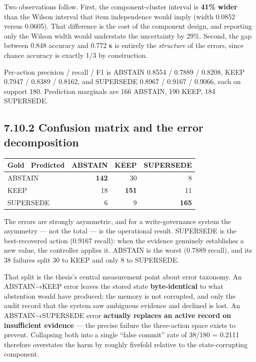 Two observations follow. First, the component-cluster interval is
\textbf{41\% wider} than the Wilson interval that item independence
would imply (width 0.0852 versus 0.0605). That difference is the cost of
the component design, and reporting only the Wilson width would
understate the uncertainty by 29\%. Second, the gap between 0.848
accuracy and 0.772 κ is entirely the \emph{structure} of the errors,
since chance accuracy is exactly 1/3 by construction.

Per-action precision / recall / F1 is ABSTAIN 0.8554 / 0.7889 / 0.8208,
KEEP 0.7947 / 0.8389 / 0.8162, and SUPERSEDE 0.8967 / 0.9167 / 0.9066,
each on support 180. Prediction marginals are 166 ABSTAIN, 190 KEEP, 184
SUPERSEDE.

\subsection{7.10.2 Confusion matrix and the error
decomposition}\label{confusion-matrix-and-the-error-decomposition}

{\def\LTcaptype{none} %
\begin{longtable}[]{@{}lrrr@{}}
\toprule\noalign{}
Gold ~Predicted & ABSTAIN & KEEP & SUPERSEDE \\
\midrule\noalign{}
\endhead
\bottomrule\noalign{}
\endlastfoot
ABSTAIN & \textbf{142} & 30 & 8 \\
KEEP & 18 & \textbf{151} & 11 \\
SUPERSEDE & 6 & 9 & \textbf{165} \\
\end{longtable}
}

The errors are strongly asymmetric, and for a write-governance system
the asymmetry --- not the total --- is the operational result. SUPERSEDE
is the best-recovered action (0.9167 recall): when the evidence
genuinely establishes a new value, the controller applies it. ABSTAIN is
the worst (0.7889 recall), and its 38 failures split 30 to KEEP and only
8 to SUPERSEDE.

That split is the thesis's central measurement point about error
taxonomy. An ABSTAIN→KEEP error leaves the stored state
\textbf{byte-identical} to what abstention would have produced; the
memory is not corrupted, and only the audit record that the system saw
ambiguous evidence and declined is lost. An ABSTAIN→SUPERSEDE error
\textbf{actually replaces an active record on insufficient evidence} ---
the precise failure the three-action space exists to prevent. Collapsing
both into a single ``false commit'' rate of 38/180 = 0.2111 therefore
overstates the harm by roughly fivefold relative to the state-corrupting
component.


